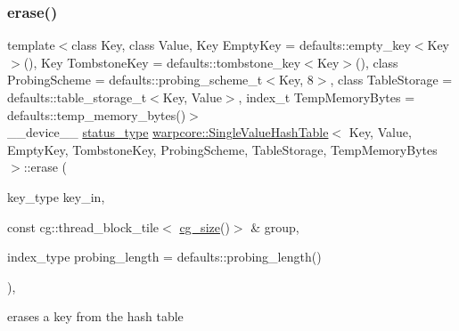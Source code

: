 \subsubsection{\texorpdfstring{erase()}{erase()}\hspace{0.1cm}{\footnotesize\ttfamily [1/2]}}
{\footnotesize\ttfamily template$<$class Key, class Value, Key Empty\+Key = defaults\+::empty\+\_\+key$<$\+Key$>$(), Key Tombstone\+Key = defaults\+::tombstone\+\_\+key$<$\+Key$>$(), class Probing\+Scheme = defaults\+::probing\+\_\+scheme\+\_\+t$<$\+Key, 8$>$, class Table\+Storage = defaults\+::table\+\_\+storage\+\_\+t$<$\+Key, Value$>$, index\+\_\+t Temp\+Memory\+Bytes = defaults\+::temp\+\_\+memory\+\_\+bytes()$>$ \\
\+\_\+\+\_\+device\+\_\+\+\_\+ \hyperlink{classwarpcore_1_1Status}{status\+\_\+type} \hyperlink{classwarpcore_1_1SingleValueHashTable}{warpcore\+::\+Single\+Value\+Hash\+Table}$<$ Key, Value, Empty\+Key, Tombstone\+Key, Probing\+Scheme, Table\+Storage, Temp\+Memory\+Bytes $>$\+::erase (\begin{DoxyParamCaption}\item[{key\+\_\+type}]{key\+\_\+in,  }\item[{const cg\+::thread\+\_\+block\+\_\+tile$<$ \hyperlink{classwarpcore_1_1SingleValueHashTable_aaa4cf7e3252a0b177101fca437e5309e}{cg\+\_\+size}()$>$ \&}]{group,  }\item[{index\+\_\+type}]{probing\+\_\+length = {\ttfamily defaults\+:\+:probing\+\_\+length()} }\end{DoxyParamCaption})\hspace{0.3cm}{\ttfamily [inline]}, {\ttfamily [noexcept]}}



erases a key from the hash table 


